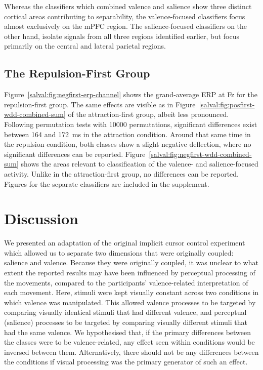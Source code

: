 \clearpage 

Whereas the classifiers which combined valence and salience show three distinct cortical areas contributing to separability, the valence-focused classifiers focus almost exclusively on the mPFC region. The salience-focused classifiers on the other hand, isolate signals from all three regions identified earlier, but focus primarily on the central and lateral parietal regions.


\subsection{The Repulsion-First Group}
\label{salval:sec:results:repulsionfirst}%

Figure~\ref{salval:fig:negfirst-erp-channel} shows the grand-average ERP at Fz for the repulsion-first group. The same effects are visible as in Figure~\ref{salval:fig:posfirst-wdd-combined-sum} of the attraction-first group, albeit less pronounced. Following permutation tests with 10000 permutations, significant differences exist between 164 and 172~ms in the attraction condition. Around that same time in the repulsion condition, both classes show a slight negative deflection, where no significant differences can be reported. Figure~\ref{salval:fig:negfirst-wdd-combined-sum} shows the areas relevant to classification of the valence- and salience-focused activity. Unlike in the attraction-first group, no differences can be reported. Figures for the separate classifiers are included in the supplement.


\section{Discussion}

We presented an adaptation of the original implicit cursor control experiment \cite{zander2014implicit,zander2016nat} which allowed us to separate two dimensions that were originally coupled: salience and valence. Because they were originally coupled, it was unclear to what extent the reported results may have been influenced by perceptual processing of the movements, compared to the participants' valence-related interpretation of each movement. Here, stimuli were kept visually constant across two conditions in which valence was manipulated. This allowed valence processes to be targeted by comparing visually identical stimuli that had different valence, and perceptual (salience) processes to be targeted by comparing visually different stimuli that had the same valence. We hypothesised that, if the primary differences between the classes were to be valence-related, any effect seen within conditions would be inversed between them. Alternatively, there should not be any differences between the conditions if visual processing was the primary generator of such an effect. 

